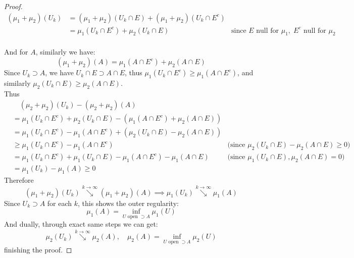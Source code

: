\documentclass[lang=cn,11pt]{elegantbook}
\begin{document}
\begin{proof}
\begin{align*}
(\mu_1 + \mu_2)(U_k) & =     (\mu_1 + \mu_2)(U_k \cap E) + (\mu_1 + \mu_2)(U_k \cap E^c)\\
&= \mu_1(U_k \cap E^c) + \mu_2(U_k \cap E) &\text{since }E \text{ null for } \mu_1,\; E^c  \text{ null for } \mu_2\\
\end{align*}

And for $A$, similarly we have:\[
(\mu_1 + \mu_2)(A)  = \mu_1(A \cap E^c) + \mu_2(A \cap E)
\]
Since $U_k \supset A$, we have \( U_k \cap E \supset A \cap E \), thus $\mu_1(U_k\cap E^c) \geq \mu_1(A \cap E^c)$, and similarly $\mu_2 (U_k \cap E ) \geq \mu_2(A \cap E)$.\\
Thus
\begin{align*}
   &\quad (\mu_2 + \mu_2) (U_k) - (\mu_2 + \mu_2) (A) \\
   & = \mu_1 (U_k \cap E^c) + \mu_2 (U_k \cap E) - (\mu_1(A \cap E^c) + \mu_2(A \cap E))\\
    & =\mu_1(U_k \cap  E^c) - \mu_1(A \cap E^c)  + (\mu_2 (U_k \cap E) - \mu_2(A\cap E))     \\
    &\geq \mu_1(U_k \cap E^c) - \mu_1(A \cap E^c)  &\text{(since $\mu_2 (U_k \cap E) - \mu_2(A\cap E)\geq 0$}\text{)}\\
    & = \mu_1(U_k \cap E^c) + \mu_1 (U_k \cap E) - \mu_1(A \cap E^c) - \mu_1 (A\cap E)  &\text{(since $\mu_1 (U_k \cap E),  \mu_2(A\cap E) = 0$)}\\
    & = \mu_1 (U_k) - \mu_1 (A) \geq 0
\end{align*}
Therefore \[
(\mu_1 + \mu_2)(U_k) \overset{{k\to \infty}}{\searrow} (\mu_1 + \mu_2)(A) \implies \mu_1(U_k) \overset{{k\to \infty}}{\searrow} \mu_1(A) 
\]
Since $U_k \supset A$ for each $k$, this shows the outer regularity:\[
\mu_1 (A) = \inf_{U \text{ open } \supset A}  \mu_1(U)
\]
And dually, through exact same steps we can get: \[
\mu_2(U_k) \overset{{k\to \infty}}{\searrow} \mu_2(A) ,\quad \mu_2(A) = \inf_{U \text{ open } \supset A}  \mu_2(U)
\]
finishing the proof.
\end{proof}
\end{document}
